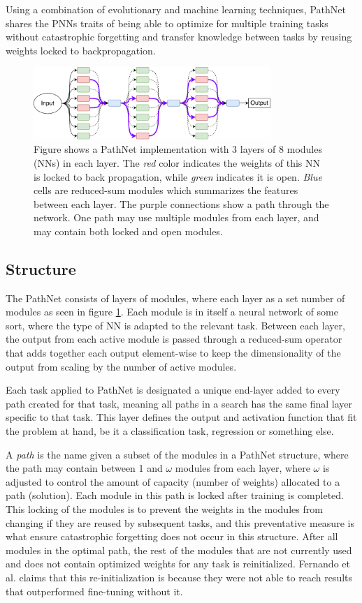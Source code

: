 Using a combination of evolutionary and machine learning techniques, PathNet shares the PNNs traits of being able to optimize for multiple training tasks without catastrophic forgetting and transfer knowledge between tasks by reusing weights locked to backpropagation.  
\begin{figure}[ht]
    \centering
    \includegraphics[width=0.8\textwidth]{Chapters/2.Background/figures/PathNet.pdf}
    \caption[PathNet structure]{Figure shows a PathNet implementation with 3 layers of 8 modules (NNs) in each layer. The \textit{red} color indicates the weights of this NN is locked to back propagation, while \textit{green} indicates it is open. \textit{Blue} cells are reduced-sum modules which summarizes the features between each layer. The purple connections show a path through the network. One path may use multiple modules from each layer, and may contain both locked and open modules.}
    \label{fig:pathnet}
\end{figure}

\subsection{Structure}
The PathNet consists of layers of modules, where each layer as a set number of modules as seen in figure \ref{fig:pathnet}. Each module is in itself a neural network of some sort, where the type of NN is adapted to the relevant task. Between each layer, the output from each active module is passed through a reduced-sum operator that adds together each output element-wise to keep the dimensionality of the output from scaling by the number of active modules. 

Each task applied to PathNet is designated a unique end-layer added to every path created for that task, meaning all paths in a search has the same final layer specific to that task. This layer defines the output and activation function that fit the problem at hand, be it a classification task, regression or something else.  

A \textit{path} is the name given a subset of the modules in a PathNet structure, where the path may contain between 1 and \(\omega\) modules from each layer, where \(\omega\) is adjusted to control the amount of capacity (number of weights) allocated to a path (solution). Each module in this path is locked after training is completed. This locking of the modules is to prevent the weights in the modules from changing if they are reused by subsequent tasks, and this preventative measure is what ensure catastrophic forgetting does not occur in this structure. After all modules in the optimal path, the rest of the modules that are not currently used and does not contain optimized weights for any task is reinitialized. Fernando et al. claims\cite{pathnet} that this re-initialization is because they were not able to reach results that outperformed fine-tuning without it.

